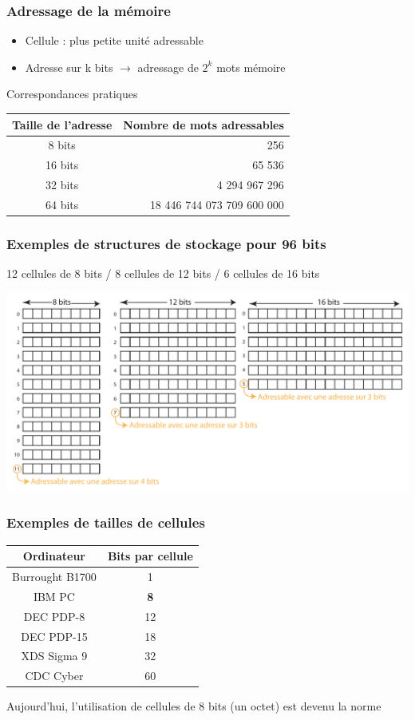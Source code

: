 \begin{frame}
\frametitle{Adressage de la mémoire}
\begin{itemize}
\item Cellule : plus petite unité adressable
\item Adresse sur k bits $\rightarrow$ adressage de $2^k$ mots mémoire
\end{itemize}

\begin{block}{Correspondances pratiques}
\begin{tabular}{c|r}
Taille de l'adresse & Nombre de mots adressables \\
\hline
8 bits & 256 \\
16 bits & 65 536 \\
32 bits & 4 294 967 296 \\
64 bits & 18 446 744 073 709 600 000 \\
\end{tabular}
\end{block}
\end{frame}



\begin{frame}
\frametitle{Exemples de structures de stockage pour 96 bits}
12 cellules de 8 bits / 8 cellules de 12 bits / 6 cellules de 16 bits

\includegraphics[width=\textwidth]{../illustration/stockage96bits.pdf}
\end{frame}

\begin{frame}
\frametitle{Exemples de tailles de cellules}
\begin{table}[htdp]
\begin{center}
\begin{tabular}{|c|c|}
\hline
Ordinateur & Bits par cellule \\
\hline
Burrought B1700 & 1 \\
IBM PC & \textbf{8} \\
DEC PDP-8 & 12 \\
DEC PDP-15 & 18 \\
XDS Sigma 9 & 32 \\
CDC Cyber & 60 \\
\hline
\end{tabular}
\end{center}
\label{default}
\end{table}
Aujourd'hui, l'utilisation de cellules de 8 bits (un octet) est devenu la norme
\end{frame}

